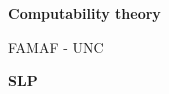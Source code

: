 \documentclass[a4paper, 12pt]{article}
\begin{document}
\begin{titlepage}
   \begin{center}
       \vspace*{1cm}

       \textbf{Computability theory}

       \small
       \vspace{0.5cm}
        FAMAF - UNC
            
       \vspace{1.5cm}
       \footnotesize
       \textbf{SLP}
       \normalsize

       \vfill
            
            
     
   \end{center}
\end{titlepage}
\end{document}
